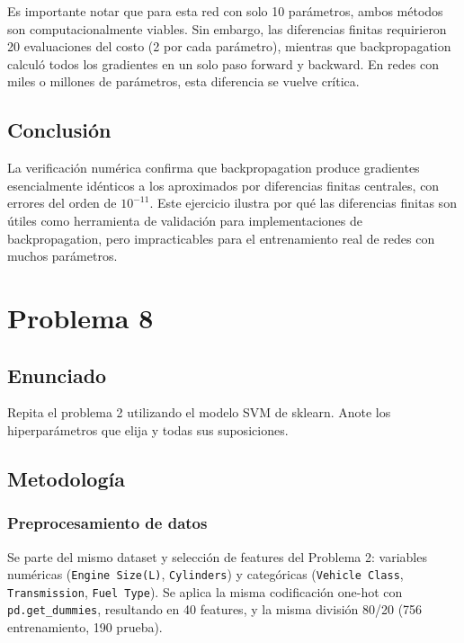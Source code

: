 \documentclass{article}
\begin{document}
Es importante notar que para esta red con solo 10 parámetros, ambos métodos son computacionalmente viables. Sin embargo, las diferencias finitas requirieron 20 evaluaciones del costo (2 por cada parámetro), mientras que backpropagation calculó todos los gradientes en un solo paso forward y backward. En redes con miles o millones de parámetros, esta diferencia se vuelve crítica.

\subsection{Conclusión}

La verificación numérica confirma que backpropagation produce gradientes esencialmente idénticos a los aproximados por diferencias finitas centrales, con errores del orden de $10^{-11}$. Este ejercicio ilustra por qué las diferencias finitas son útiles como herramienta de validación para implementaciones de backpropagation, pero impracticables para el entrenamiento real de redes con muchos parámetros.

\section{Problema 8}

\subsection{Enunciado}

Repita el problema 2 utilizando el modelo SVM de sklearn. Anote los hiperparámetros que elija y todas sus suposiciones.

\subsection{Metodología}

\subsubsection{Preprocesamiento de datos}

Se parte del mismo dataset y selección de features del Problema 2: variables numéricas (\texttt{Engine Size(L)}, \texttt{Cylinders}) y categóricas (\texttt{Vehicle Class}, \texttt{Transmission}, \texttt{Fuel Type}). Se aplica la misma codificación one-hot con \texttt{pd.get\_dummies}, resultando en 40 features, y la misma división 80/20 (756 entrenamiento, 190 prueba).
\end{document}

